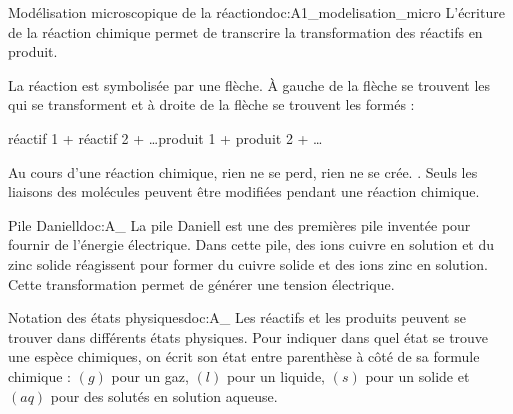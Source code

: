 \begin{doc}{Modélisation microscopique de la réaction}{doc:A1_modelisation_micro}
  L'écriture de la réaction chimique permet de transcrire la transformation des réactifs en produit.
  
  \begin{encart}
    La réaction est symbolisée par une flèche. À gauche de la flèche se trouvent les  qui se transforment et à droite de la flèche se trouvent les  formés :
    \begin{center}
      réactif 1 + réactif 2 + \ldots \reaction produit 1 + produit 2 + \ldots
    \end{center}
  \end{encart}
  
  Au cours d'une réaction chimique, rien ne se perd, rien ne se crée. .
  Seuls les liaisons des molécules peuvent être modifiées pendant une réaction chimique.
\end{doc}

\begin{doc}{Pile Daniell}{doc:A_}
  La pile Daniell est une des premières pile inventée pour fournir de l'énergie électrique.
  Dans cette pile, des ions cuivre  en solution et du zinc solide  réagissent pour former du cuivre solide  et des ions zinc  en solution.
  Cette transformation permet de générer une tension électrique.
\end{doc}

\vspace*{-30pt}



\begin{doc}{Notation des états physiques}{doc:A_}
  Les réactifs et les produits peuvent se trouver dans différents états physiques.
  Pour indiquer dans quel état se trouve une espèce chimiques, on écrit son état entre parenthèse à côté de sa formule chimique : $(g)$ pour un gaz, $(l)$ pour un liquide, $(s)$ pour un solide et $(aq)$ pour des solutés en solution aqueuse.
\end{doc}

